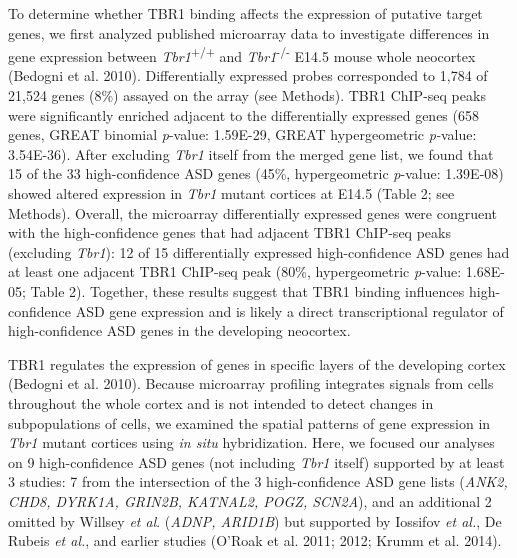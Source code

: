 \documentclass[]{article}
\begin{document}
To determine whether TBR1 binding affects the expression of putative
target genes, we first analyzed published microarray data to investigate
differences in gene expression between \emph{Tbr1}\textsuperscript{+/+}
and \emph{Tbr1}\textsuperscript{-/-} E14.5 mouse whole neocortex
(Bedogni et al. 2010). Differentially expressed probes corresponded to
1,784 of 21,524 genes (8\%) assayed on the array (see Methods). TBR1
ChIP-seq peaks were significantly enriched adjacent to the
differentially expressed genes (658 genes, GREAT binomial
\emph{p}-value: 1.59E-29, GREAT hypergeometric \emph{p-}value:
3.54E-36). After excluding \emph{Tbr1} itself from the merged gene list,
we found that 15 of the 33 high-confidence ASD genes (45\%,
hypergeometric \emph{p}-value: 1.39E-08) showed altered expression in
\emph{Tbr1} mutant cortices at E14.5 (Table 2; see Methods). Overall,
the microarray differentially expressed genes were congruent with the
high-confidence genes that had adjacent TBR1 ChIP-seq peaks (excluding
\emph{Tbr1}): 12 of 15 differentially expressed high-confidence ASD
genes had at least one adjacent TBR1 ChIP-seq peak (80\%, hypergeometric
\emph{p}-value: 1.68E-05; Table 2). Together, these results suggest that
TBR1 binding influences high-confidence ASD gene expression and is
likely a direct transcriptional regulator of high-confidence ASD genes
in the developing neocortex.

TBR1 regulates the expression of genes in specific layers of the
developing cortex (Bedogni et al. 2010). Because microarray profiling
integrates signals from cells throughout the whole cortex and is not
intended to detect changes in subpopulations of cells, we examined the
spatial patterns of gene expression in \emph{Tbr1} mutant cortices using
\emph{in situ} hybridization. Here, we focused our analyses on 9
high-confidence ASD genes (not including \emph{Tbr1} itself) supported
by at least 3 studies: 7 from the intersection of the 3 high-confidence
ASD gene lists (\emph{ANK2, CHD8, DYRK1A, GRIN2B, KATNAL2, POGZ,
SCN2A}), and an additional 2 omitted by Willsey \emph{et al}.
(\emph{ADNP, ARID1B}) but supported by Iossifov \emph{et al.}, De Rubeis
\emph{et al.}, and earlier studies (O'Roak et al. 2011; 2012; Krumm et
al. 2014).
\end{document}

